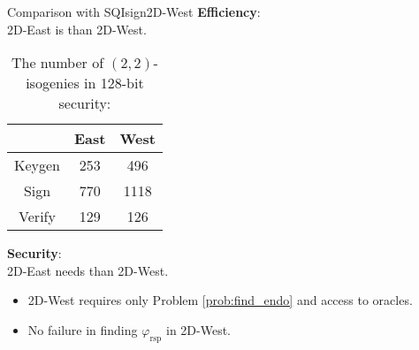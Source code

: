 \begin{frame}{Comparison with SQIsign2D-West}
    \textbf{Efficiency}:\\
    2D-East is  than 2D-West. \\[-10pt]
    \begin{table}
        \caption{The number of $(2, 2)$-isogenies in 128-bit security:}
        \begin{center}
            \begin{tabular}{c|c|c}
                & East & West \\\hline
                Keygen & 253 & 496 \\
                Sign & 770 & 1118 \\
                Verify & 129 & 126
            \end{tabular}
        \end{center}
    \end{table}

    \vspace{10pt}
    \textbf{Security}:\\
    2D-East needs  than 2D-West. 
    \begin{itemize}
        \item 2D-West requires only Problem \ref{prob:find_endo}
            and access to oracles.
        \item No failure in finding $\varphi_\mathrm{rsp}$ in 2D-West.
    \end{itemize}
\end{frame}